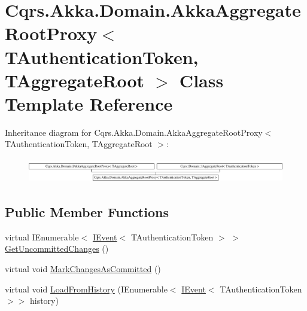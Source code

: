 \hypertarget{classCqrs_1_1Akka_1_1Domain_1_1AkkaAggregateRootProxy}{}\section{Cqrs.\+Akka.\+Domain.\+Akka\+Aggregate\+Root\+Proxy$<$ T\+Authentication\+Token, T\+Aggregate\+Root $>$ Class Template Reference}
\label{classCqrs_1_1Akka_1_1Domain_1_1AkkaAggregateRootProxy}
Inheritance diagram for Cqrs.\+Akka.\+Domain.\+Akka\+Aggregate\+Root\+Proxy$<$ T\+Authentication\+Token, T\+Aggregate\+Root $>$\+:\begin{figure}[H]
\begin{center}
\leavevmode
\includegraphics[height=1.081081cm]{classCqrs_1_1Akka_1_1Domain_1_1AkkaAggregateRootProxy}
\end{center}
\end{figure}
\subsection*{Public Member Functions}
\begin{DoxyCompactItemize}
\item 
virtual I\+Enumerable$<$ \hyperlink{interfaceCqrs_1_1Events_1_1IEvent}{I\+Event}$<$ T\+Authentication\+Token $>$ $>$ \hyperlink{classCqrs_1_1Akka_1_1Domain_1_1AkkaAggregateRootProxy_afa620ced4762b0539da23ca063fed489_afa620ced4762b0539da23ca063fed489}{Get\+Uncommitted\+Changes} ()
\item 
virtual void \hyperlink{classCqrs_1_1Akka_1_1Domain_1_1AkkaAggregateRootProxy_aaa8a46fee21b6133ae4d1b2f60983d7e_aaa8a46fee21b6133ae4d1b2f60983d7e}{Mark\+Changes\+As\+Committed} ()
\item 
virtual void \hyperlink{classCqrs_1_1Akka_1_1Domain_1_1AkkaAggregateRootProxy_ae611077a51a215aef7fd0e106734b386_ae611077a51a215aef7fd0e106734b386}{Load\+From\+History} (I\+Enumerable$<$ \hyperlink{interfaceCqrs_1_1Events_1_1IEvent}{I\+Event}$<$ T\+Authentication\+Token $>$$>$ history)
\end{DoxyCompactItemize}

